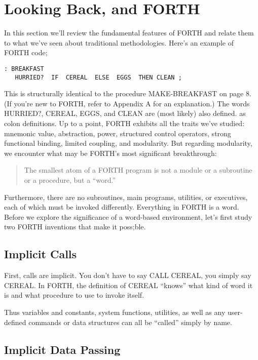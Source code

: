 \section{Looking Back, and FORTH}

In this section we'll review the fundamental features of FORTH and
relate them to what we've seen about traditional methodologies. Here's
an example of FORTH code;

\begin{verbatim}
: BREAKFAST
   HURRIED?  IF  CEREAL  ELSE  EGGS  THEN CLEAN ;
\end{verbatim}
This is structurally identical to the procedure MAKE-BREAKFAST on
page 8. (If you're new to FORTH, refer to Appendix A for an explanation.)
The words HURRIED?, CEREAL, EGGS, and CLEAN are (most likely) also
defined. as colon definitions. Up to a point, FORTH exhibits all the
traits we've studied: mnemonic value, abstraction, power, structured
control operators, strong functional binding, limited coupling, and
modularity. But regarding modularity, we encounter what may be FORTH's
most significant breakthrough:

\begin{quote}
The smallest atom of a FORTH program is not a module or a subroutine
or a procedure, but a {}``word.''
\end{quote}
Furthermore, there are no subroutines, main programs, utilities, or
executives, each of which must be invoked differently. Everything
in FORTH is a word. Before we explore the significance of a word-based
environment, let's first study two FORTH inventions that make it poss;ble.


\subsection{Implicit Calls}

First, calls are implicit. You don't have to say CALL CEREAL, you
simply say CEREAL. In FORTH, the definition of CEREAL {}``knows''
what kind of word it is and what procedure to use to invoke itself.

Thus variables and constants, system functions, utilities, as well
as any user-defined commands or data structures can all be {}``called''
simply by name.


\subsection{Implicit Data Passing}

